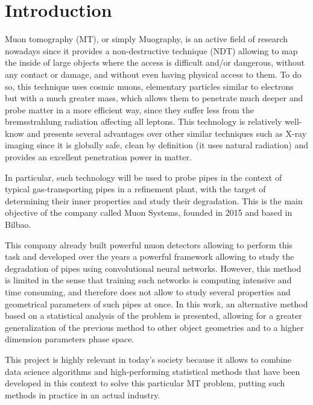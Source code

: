 \documentclass[a4paper, 11pt, twoside, openright]{report}
\begin{document}
\newpage


\tableofcontents

\thispagestyle{empty}
\newpage



\chapter{Introduction}

Muon tomography (MT), or simply Muography, is an active field of research nowadays since it provides a non-destructive technique (NDT) allowing to map the inside of large objects where the access is difficult and/or dangerous, without any contact or damage, and without even having physical access to them. To do so, this technique uses cosmic muons, elementary particles similar to electrons but with a much greater mass, which allows them to penetrate much deeper and probe matter in a more efficient way, since they suffer less from the bremsstrahlung radiation affecting all leptons. This technology is relatively well-know and presents several advantages over other similar techniques such as X-ray imaging since it is globally safe, clean by definition (it uses natural radiation) and provides an excellent penetration power in matter.

In particular, such technology will be used to probe pipes in the context of typical gas-transporting pipes in a refinement plant, with the target of determining their inner properties and study their degradation. This is the main objective of the company called Muon Systems, founded in 2015 and based in Bilbao.

This company already built powerful muon detectors allowing to perform this task and developed over the years a powerful framework allowing to study the degradation of pipes using convolutional neural networks. However, this method is limited in the sense that training such networks is computing intensive and time consuming, and therefore does not allow to study several properties and geometrical parameters of such pipes at once. In this work, an alternative method based on a statistical analysis of the problem is presented, allowing for a greater generalization of the previous method to other object geometries and to a higher dimension parameters phase space.

This project is highly relevant in today's society because it allows to combine data science algorithms and high-performing statistical methods that have been developed in this context to solve this particular MT problem, putting such methods in practice in an actual industry.
\end{document}

